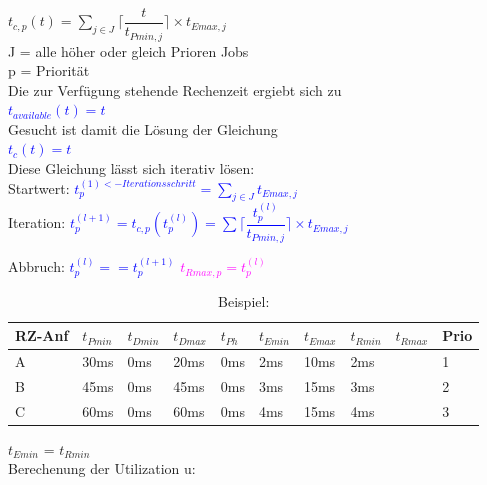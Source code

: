 \documentclass[12pt,a4paper,oneside,ngerman]{article}
\begin{document}
\( t_{c,p}(t) = \displaystyle\sum_{j \in J} \Big\lceil \dfrac{t}{ t_{Pmin,j} } \Big\rceil \times t_{Emax,j} \)\\
J = alle höher oder gleich Prioren Jobs\\
p = Priorität\\

Die zur Verfügung stehende Rechenzeit ergiebt sich zu \\
\textcolor{blue}{\( t_{available}(t) = t \)}\\
Gesucht ist damit die Lösung der Gleichung\\
\textcolor{blue}{\( t_c(t) = t \)}\\
Diese Gleichung lässt sich iterativ lösen:\\
Startwert: \textcolor{blue}{ \(t_{p}^{(1)<-Iterationsschritt} = \displaystyle\sum_{j \in J} t_{Emax,j} \)}\\

Iteration: \textcolor{blue}{ \( t_{p}^{(l+1)} = t_{c,p}(t_{p}^{(l)}) = \displaystyle\sum \Big\lceil \dfrac{t_{p}^{(l)}}{ t_{Pmin,j} } \Big\rceil \times t_{Emax,j} \) }

Abbruch: \textcolor{blue}{ \( t_{p}^{(l)} == t_{p}^{(l+1)} \) }  \textcolor{magenta}{ \( t_{Rmax,p} = t_{p}^{(l)} \) }

\pagebreak

\begin{table}[H]
	\caption{Beispiel:}
	\begin{tabular}{|l|l|l|l|l|l|l|l|l|l|}
	\hline
	RZ-Anf & \(t_{Pmin}\) & \(t_{Dmin}\) & \(t_{Dmax}\) & \(t_{Ph}\) & \(t_{Emin}\) & \(t_{Emax}\) & \(t_{Rmin}\) & \(t_{Rmax}\) & Prio \\ \hline
	A      & 30ms         & 0ms          & 20ms         & 0ms        & 2ms          & 10ms         & 2ms          &              & 1    \\ \hline
	B      & 45ms         & 0ms          & 45ms         & 0ms        & 3ms          & 15ms         & 3ms          &              & 2    \\ \hline
	C      & 60ms         & 0ms          & 60ms         & 0ms        & 4ms          & 15ms         & 4ms          &              & 3    \\ \hline
	\end{tabular}
\end{table}

\(t_{Emin}\) = \(t_{Rmin}\)\\

Berechenung der Utilization u:
\end{document}
